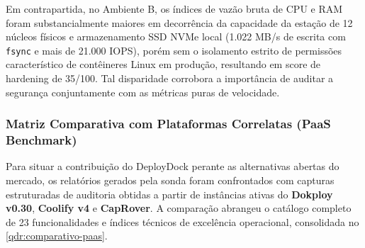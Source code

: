 Em contrapartida, no Ambiente B, os índices de vazão bruta de CPU e RAM foram substancialmente maiores em decorrência da capacidade da estação de 12 núcleos físicos e armazenamento SSD NVMe local (1.022 MB/s de escrita com \texttt{fsync} e mais de 21.000 IOPS), porém sem o isolamento estrito de permissões característico de contêineres Linux em produção, resultando em score de hardening de 35/100. Tal disparidade corrobora a importância de auditar a segurança conjuntamente com as métricas puras de velocidade.

\subsubsection{Matriz Comparativa com Plataformas Correlatas (PaaS Benchmark)}

Para situar a contribuição do DeployDock perante as alternativas abertas do mercado, os relatórios gerados pela sonda foram confrontados com capturas estruturadas de auditoria obtidas a partir de instâncias ativas do \textbf{Dokploy v0.30}, \textbf{Coolify v4} e \textbf{CapRover}. A comparação abrangeu o catálogo completo de 23 funcionalidades e índices técnicos de excelência operacional, consolidada no \autoref{qdr:comparativo-paas}.

